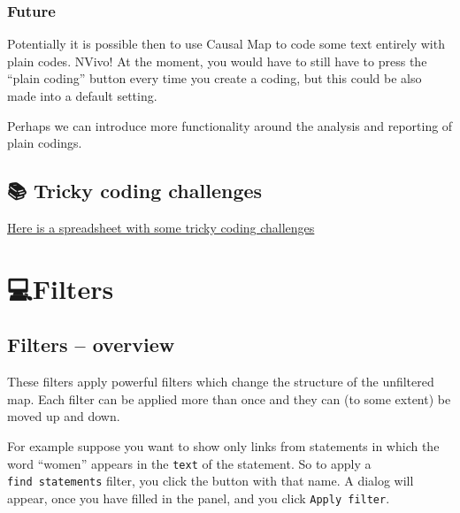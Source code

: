 \documentclass[
]{book}
\begin{document}
\hypertarget{future}{%
\section{Future}\label{future}}

Potentially it is possible then to use Causal Map to code some text entirely with plain codes. NVivo! At the moment, you would have to still have to press the ``plain coding'' button every time you create a coding, but this could be also made into a default setting.

Perhaps we can introduce more functionality around the analysis and reporting of plain codings.

\hypertarget{tricky-coding-challenges}{%
\chapter{📚 Tricky coding challenges}\label{tricky-coding-challenges}}

\href{https://docs.google.com/spreadsheets/d/1aRCKmuLO3rJR5gXo6-hW_WuOHRAJQ-DzJsUdgO44JCE/edit\#gid=0}{Here is a spreadsheet with some tricky coding challenges}

\hypertarget{part-filters}{%
\part{💻Filters}\label{part-filters}}

\hypertarget{filters-overview}{%
\chapter{Filters -- overview}\label{filters-overview}}

These filters apply powerful filters which change the structure of the unfiltered map. Each filter can be applied more than once and they can (to some extent) be moved up and down.

For example suppose you want to show only links from statements in which the word ``women'' appears in the \texttt{text} of the statement. So to apply a \texttt{find\ statements} filter, you click the button with that name. A dialog will appear, once you have filled in the panel, and you click \texttt{Apply\ filter}.
\end{document}
